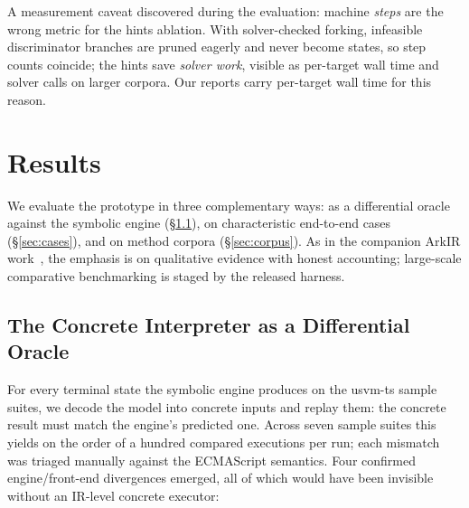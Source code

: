 \documentclass[sigconf,nonacm,screen]{acmart}
\begin{document}
A measurement caveat discovered during the evaluation: machine \emph{steps}
are the wrong metric for the hints ablation. With solver-checked forking,
infeasible discriminator branches are pruned eagerly and never become
states, so step counts coincide; the hints save \emph{solver work}, visible
as per-target wall time and solver calls on larger corpora. Our reports
carry per-target wall time for this reason.

\section{Results}

We evaluate the prototype in three complementary ways: as a differential
oracle against the symbolic engine (\S\ref{sec:findings}), on
characteristic end-to-end cases (\S\ref{sec:cases}), and on method corpora
(\S\ref{sec:corpus}). As in the companion ArkIR work~\cite{menshutin2025},
the emphasis is on qualitative evidence with honest accounting; large-scale
comparative benchmarking is staged by the released harness.

\subsection{The Concrete Interpreter as a Differential Oracle}
\label{sec:findings}

For every terminal state the symbolic engine produces on the usvm-ts sample
suites, we decode the model into concrete inputs and replay them: the
concrete result must match the engine's predicted one. Across seven sample
suites this yields on the order of a hundred compared executions per run;
each mismatch was triaged manually against the ECMAScript semantics. Four
confirmed engine/front-end divergences emerged, all of which would have been
invisible without an IR-level concrete executor:
\end{document}
